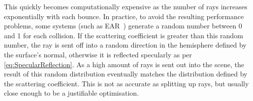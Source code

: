 This quickly becomes computationally expensive as the number of rays increases exponentially with each bounce.
\newline
In practice, to avoid the resulting performance problems,
some systems (such as EAR~\cite{Kr17}) generate a random number between 0 and 1 for each collision.
If the scattering coefficient is greater than this random number,
the ray is sent off into a random direction in the hemisphere defined by the surface's normal,
otherwise it is reflected specularly as per \ref{eq:SpecularReflection}.
As a high amount of rays is sent out into the scene,
the result of this random distribution eventually matches the distribution defined by the scattering coefficient.
This is not as accurate as splitting up rays,
but usually close enough to be a justifiable optimisation.
